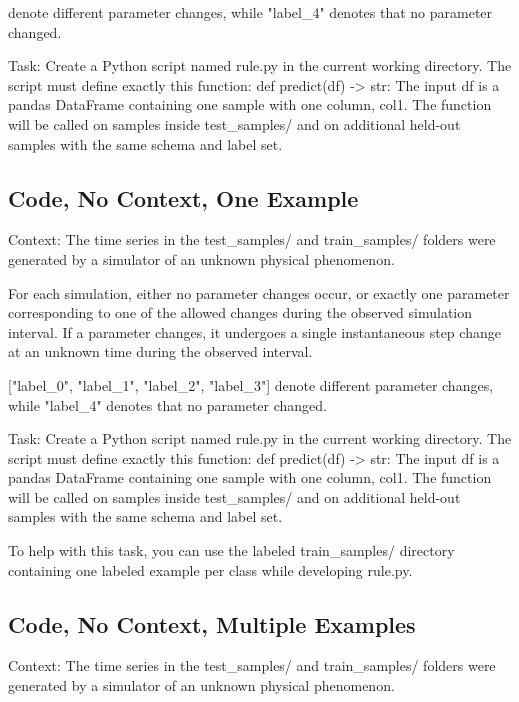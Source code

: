 \documentclass[11pt]{article}
\begin{document}
\begin{DocCode}
\begin{DocCode}
\begin{DocCode}
 denote different parameter changes, while "label_4" denotes that no parameter changed.

Task:
Create a Python script named rule.py in the current working directory.
The script must define exactly this function:
def predict(df) -> str:
The input df is a pandas DataFrame containing one sample with one column, col1.
The function will be called on samples inside test_samples/ and on additional held-out samples with the same schema and label set.
\end{DocCode}

\subsection*{Code, No Context, One Example}
\begin{DocCode}
Context:
The time series in the test_samples/ and train_samples/ folders were generated by a simulator of an unknown physical phenomenon.

For each simulation, either no parameter changes occur, or exactly one parameter corresponding to one of the allowed changes during the observed simulation interval.
If a parameter changes, it undergoes a single instantaneous step change at an unknown time during the observed interval.

["label_0", "label_1", "label_2", "label_3"] denote different parameter changes, while "label_4" denotes that no parameter changed.

Task:
Create a Python script named rule.py in the current working directory.
The script must define exactly this function:
def predict(df) -> str:
The input df is a pandas DataFrame containing one sample with one column, col1.
The function will be called on samples inside test_samples/ and on additional held-out samples with the same schema and label set.

To help with this task, you can use the labeled train_samples/ directory containing one labeled example per class while developing rule.py. 
\end{DocCode}

\subsection*{Code, No Context, Multiple Examples}
\begin{DocCode}
Context:
The time series in the test_samples/ and train_samples/ folders were generated by a simulator of an unknown physical phenomenon.


\end{DocCode}
\end{DocCode}
\end{DocCode}
\end{document}
